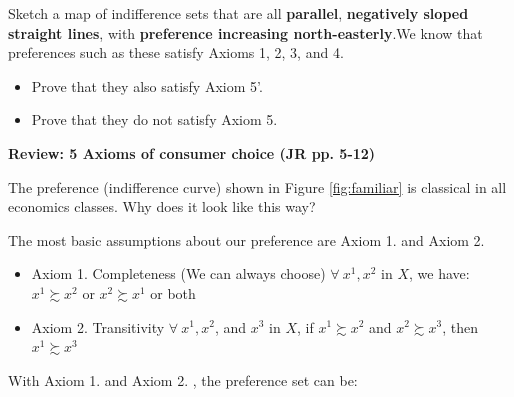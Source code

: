 \documentclass{article}
\begin{document}
Sketch a map of indifference sets that are all \textbf{parallel}, \textbf{negatively sloped 
straight lines}, with \textbf{preference increasing north-easterly}.We know that preferences 
such as these satisfy Axioms 1, 2, 3, and 4. 
\begin{itemize}
\item Prove that they also satisfy Axiom 5'. 
\item Prove that they do not satisfy Axiom 5.
\end{itemize}

\begin{mdframed}[backgroundcolor=blue!20,linecolor=white] 

\textbf{Review: 5 Axioms of consumer choice (JR pp. 5-12)}

\vspace{2mm}

The preference (indifference curve) shown in Figure \ref{fig:familiar} is classical in all
economics classes. Why does it look like this way?

\vspace{2mm}

{\centering
{}
\label{fig:familiar}}
\vspace{2mm}

The most basic assumptions about our preference are Axiom 1.  and Axiom 2. 

\begin{itemize}
\item Axiom 1. Completeness (We can always choose)
$\forall \ x^1, x^2$ in $X$, we have: $x^1 \succsim  x^2$ or $x^2 \succsim  x^1$  or both
\item Axiom 2. Transitivity
$\forall \ x^1, x^2$, and  $x^3$ in $X$, if $x^1 \succsim  x^2$ and $x^2 \succsim  x^3$, then $x^1 \succsim  x^3$
\end{itemize}

With Axiom 1. and Axiom 2. , the preference set can be:

\vspace{2mm}


\end{mdframed}
\end{document}
